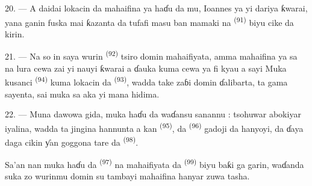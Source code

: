 \VUsaut{3.0mm}

20. --- A daidai lokacin da mahaifina ya haɗu da mu, Ioannes ya yi
dariya ƙwarai, yana ganin fuska mai ƙazanta da tufafi masu ban mamaki
na  \textsuperscript{(91)} biyu cike
da kirin.

21. --- Na so in saya wurin 
\textsuperscript{(92)} tsiro domin mahaifiyata, amma mahaifina ya sa na
lura cewa zai yi nauyi ƙwarai a ɗauka kuma cewa ya fi kyau a sayi
 Muka kusanci  \textsuperscript{(94)}
kuma lokacin da  \textsuperscript{(93)}, wadda take
zaɓi domin ɗalibarta, ta gama sayenta, sai muka sa aka yi mana hidima.

22. --- Muna dawowa gida, muka haɗu da waɗansu sanannu : tsohuwar
abokiyar iyalina, wadda ta jingina hannunta a kan  \textsuperscript{(95)}, da  \textsuperscript{(96)}
gadoji da hanyoyi, da ɗaya daga cikin ƴan goggona tare da  \textsuperscript{(98)}.

Sa’an nan muka haɗu da  \textsuperscript{(97)} na
mahaifiyata da  \textsuperscript{(99)} biyu baƙi ga
garin, waɗanda suka zo wurinmu domin su tambayi mahaifina hanyar zuwa
tasha.

\VUsaut{6.0mm}
\VUfilet{22mm}
